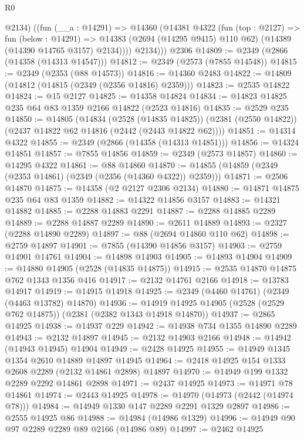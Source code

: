 \begin{lexlean}{R0}
\begin{coremodule}
          @2134)
        ((fun (__a : @14291) =>
        @14360
          (@14381
            @4322
            (fun (top : @2127) =>
            fun (below : @14291) =>
            @14383 (@2694 (@14295 @9415) @110 @62) (@14389 (@14390 @14765 @3157) @2134))))
          @2134)))
    @2306
@14809 := @2349 (@2866 (@14358 (@14313 @14547)))
@14812 := @2349 (@2573 (@7855 @14548))
@14815 := @2349 (@2353 (@88 @14573))
@14816 := @14360 @2483
@14822 := @14809 (@14812 (@14815 (@2349 (@2356 @14816) @2359)))
@14823 := @2535 @14822
@14824 := @15 @2127
@14825 := @14358 @14824
@14834 := @14823 @14825 @235 @64 @83 @1359 @2166 @14822 (@2523 @14816)
@14835 := @2529 @235
@14850 := @14805
    (@14834
      (@2528 (@14835 @14825))
      (@2381 (@2550 @14822))
      (@2437 @14822 @62 @14816 (@2442 (@2443 @14822 @62))))
@14851 := @14314 @4322
@14855 := @2349 (@2866 (@14358 (@14313 @14851)))
@14856 := @14324 @14851
@14857 := @7855 @14856
@14859 := @2349 (@2573 @14857)
@14860 := @14295 @4322
@14861 := @88 @14860
@14870 := @14855 (@14859 (@2349 (@2353 @14861) (@2349 (@2356 (@14360 @4322)) @2359)))
@14871 := @2506 @14870
@14875 := @14358 (@2 @2127 @2306 @2134)
@14880 := @14871 @14875 @235 @64 @83 @1359
@14882 := @14322 @14856 @3157
@14883 := @14321 @14882
@14885 := @2288 @14883 @2291
@14887 := @2288 @14885 @2289
@14889 := @2288 @14887 @2289
@14890 := @2611 @14889
@14893 := @2327 (@2288 @14890 @2289)
@14897 := @88 (@2694 @14860 @110 @62)
@14898 := @2759 @14897
@14901 := @7855 (@14390 @14856 @3157)
@14903 := @2759 @14901 @14761
@14904 := @14898 @14903
@14905 := @14893 @14904
@14909 := @14880 @14905 (@2528 (@14835 @14875))
@14915 := @2535 @14870 @14875 @762 @1343 @1356 @416
@14917 := @2132 @14761 @2166
@14918 := @13783 @14917
@14919 := @14915 @14918
@14925 := @2349 (@4460 @14761) (@2349 (@4463 @13782) @14870)
@14936 := @14919 @14925 @14905 (@2528 (@2529 @762 @14875)) (@2381 (@2382 @1343 @14918 @14870))
@14937 := @2865 @14925
@14938 := @14937 @229
@14942 := @14938 @734 @1355 @14890 @2289
@14943 := @2132 @14897
@14945 := @2132 @14903 @2166
@14948 := @14942 (@14943 @14945) @14904
@14949 := @2428 @14925
@14955 := @14949 @1345 @1354 @2610 @14889 @14897 @14945
@14964 := @2418 @14925 @154 @1333 @2608 @2289 (@2132 @14861 @2898) @14897
@14970 := @14949 @199 @1332 @2289 @2292 @14861 @2898
@14971 := @2437 @14925
@14973 := @14971 @78 @14861
@14974 := @2443 @14925
@14978 := @14970 (@14973 (@2442 (@14974 @78)))
@14984 := @14949 @1330 @147 @2289 @2291 @1329 @2897
@14986 := @2555 @14925 @86
@14988 := @14984 (@14986 @1329)
@14996 := @14949 @90 @97 @2289 @2289 @89 @2166 (@14986 @89)
@14997 := @2462 @14925

\end{coremodule}
\end{lexlean}
